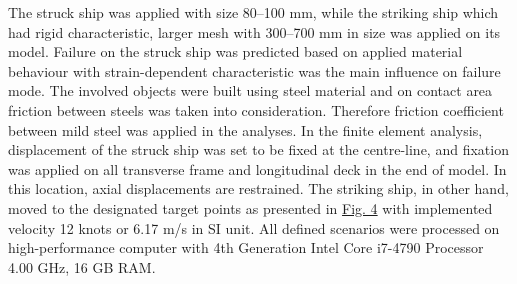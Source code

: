 \documentclass[../Final.tex]{subfiles}
\begin{document}
The struck ship was applied with size 80–100 mm, while the striking ship which had rigid characteristic, larger mesh with 300–700 mm in size was applied on its model. 
Failure on the struck ship was predicted based on applied material behaviour with strain-dependent characteristic was the main influence on failure mode. 
The involved objects were built using steel material and on contact area friction between steels was taken into consideration. Therefore friction coefficient between mild steel was applied in the analyses. 
In the finite element analysis, displacement of the struck ship was set to be fixed at the centre-line, and fixation was applied on all transverse frame and longitudinal deck in the end of model. 
In this location, axial displacements are restrained. The striking ship, in other hand, moved to the designated target points as presented in \hyperref[fig4]{Fig. 4} with implemented velocity 12 knots or 6.17 m/s in SI unit. 
All defined scenarios were processed on high-performance computer with 4th Generation Intel Core i7-4790 Processor 4.00 GHz, 16 GB RAM. 
\end{document}
